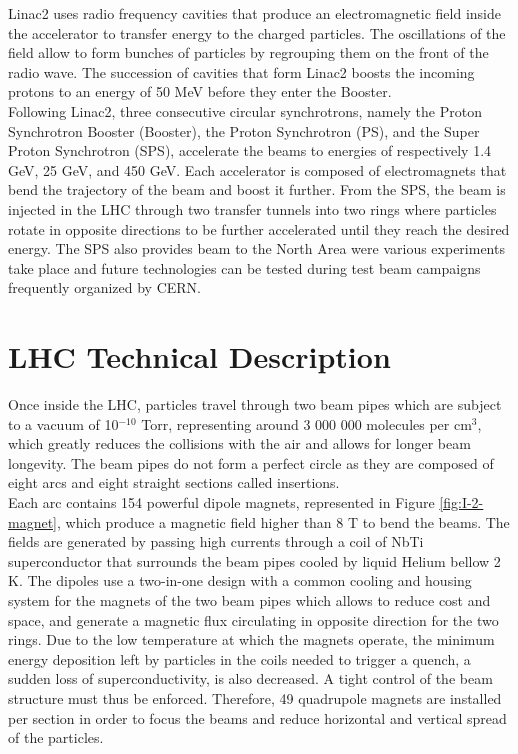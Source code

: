     Linac2 uses radio frequency cavities that produce an electromagnetic field inside the accelerator to transfer energy to the charged particles. The oscillations of the field allow to form bunches of particles by regrouping them on the front of the radio wave. The succession of cavities that form Linac2 boosts the incoming protons to an energy of 50 MeV before they enter the Booster. \\

    Following Linac2, three consecutive circular synchrotrons, namely the Proton Synchrotron Booster (Booster), the Proton Synchrotron (PS), and the Super Proton Synchrotron (SPS), accelerate the beams to energies of respectively 1.4 GeV, 25 GeV, and 450 GeV. Each accelerator is composed of electromagnets that bend the trajectory of the beam and boost it further. From the SPS, the beam is injected in the LHC through two transfer tunnels into two rings where particles rotate in opposite directions to be further accelerated until they reach the desired energy. The SPS also provides beam to the North Area were various experiments take place and future technologies can be tested during test beam campaigns frequently organized by CERN.

  \section{LHC Technical Description}

    Once inside the LHC, particles travel through two beam pipes which are subject to a vacuum of 10$^{-10}$ Torr, representing around 3 000 000 molecules per cm$^3$, which greatly reduces the collisions with the air and allows for longer beam longevity. The beam pipes do not form a perfect circle as they are composed of eight arcs and eight straight sections called insertions. \\

    Each arc contains 154 powerful dipole magnets, represented in Figure \ref{fig:I-2-magnet}, which produce a magnetic field higher than 8 T to bend the beams. The fields are generated by passing high currents through a coil of NbTi superconductor that surrounds the beam pipes cooled by liquid Helium bellow 2 K. The dipoles use a two-in-one design with a common cooling and housing system for the magnets of the two beam pipes which allows to reduce cost and space, and generate a magnetic flux circulating in opposite direction for the two rings. Due to the low temperature at which the magnets operate, the minimum energy deposition left by particles in the coils needed to trigger a quench, a sudden loss of superconductivity, is also decreased. A tight control of the beam structure must thus be enforced. Therefore, 49 quadrupole magnets are installed per section in order to focus the beams and reduce horizontal and vertical spread of the particles. \\

